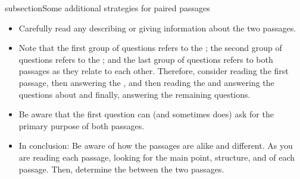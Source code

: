 subsection{Some additional strategies for paired passages}

\begin{itemize}
\item Carefully read any \longline describing or giving information about the two passages.

\item Note that the first group of questions refers to the \longline; the second group of questions refers to the \longline; and the last group of questions refers to both passages as they relate to each other. Therefore, consider reading the first passage, then answering the \longline, and then reading the \longline and answering the questions about \longline and finally, answering the remaining questions.

\item Be aware that the first question can (and sometimes does) ask for the primary purpose of both passages.

\item In conclusion: Be aware of how the passages are alike and different. As you are reading each passage, looking for the main point, structure, and \longline of each passage. Then, determine the \longline between the two passages. 
\end{itemize}